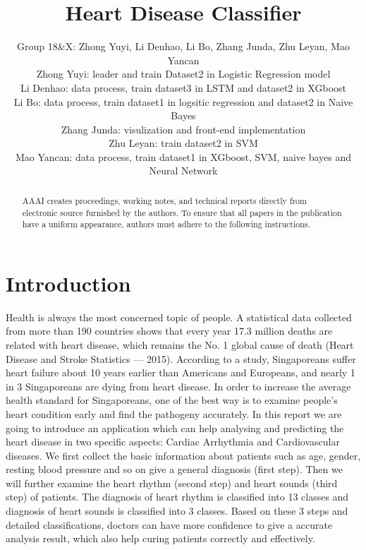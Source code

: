 \documentclass[letterpaper]{article} %
\begin{document}
%
\title{Heart Disease Classifier}
\author{Group 18\&X: Zhong Yuyi, Li Denhao, Li Bo, Zhang Junda, Zhu Leyan, Mao Yancan\\
Zhong Yuyi: leader and train Dataset2 in Logistic Regression model\\
Li Denhao: data process, train dataset3 in LSTM and dataset2 in XGboost\\
Li Bo: data process, train dataset1 in logsitic regression and dataset2 in Naive Bayes\\
Zhang Junda: visulization and front-end implementation\\
Zhu Leyan: train dataset2 in SVM \\
Mao Yancan: data process, train dataset1 in XGboost, SVM, naive bayes and Neural Network\\
}
\maketitle
\begin{abstract}
AAAI creates proceedings, working notes, and technical reports directly from electronic source furnished by the authors. To ensure that all papers in the publication have a uniform appearance, authors must adhere to the following instructions. 
\end{abstract}

\section{Introduction}
Health is always the most concerned topic of people. A statistical data collected from more than 190 countries shows that every year 17.3 million deaths are related with heart disease, which remains the No. 1 global cause of death (Heart Disease and Stroke Statistics — 2015). According to a study, Singaporeans suffer heart failure about 10 years earlier than Americans and Europeans, and nearly 1 in 3 Singaporeans are dying from heart disease. In order to increase the average health standard for Singaporeans, one of the best way is to examine people’s heart condition early and find the pathogeny accurately.
In this report we are going to introduce an application which can help analysing and predicting the heart disease in two specific aspects: Cardiac Arrhythmia and Cardiovascular diseases. We first collect the basic information about patients such as age, gender, resting blood pressure and so on give a general diagnosis (first step). Then we will further examine the heart rhythm (second step) and heart sounds (third step) of patients. The diagnosis of heart rhythm is classified into 13 classes and diagnosis of heart sounds is classified into 3 classes. Based on these 3 steps and detailed classifications, doctors can have more confidence to give a accurate analysis result, which also help curing patients correctly and effectively.
 
\end{document}
